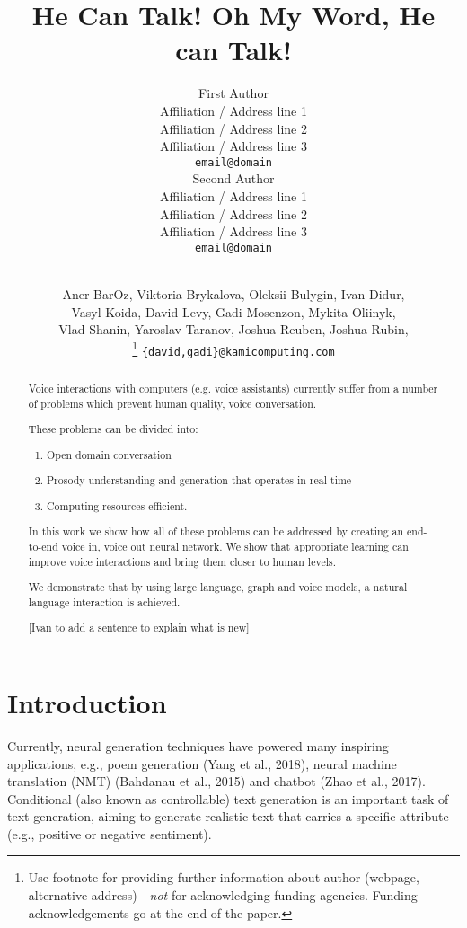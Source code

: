 \documentclass[11pt,a4paper]{article}
\title{He Can Talk! Oh My Word, He can Talk!}
\author{First Author \\
  Affiliation / Address line 1 \\
  Affiliation / Address line 2 \\
  Affiliation / Address line 3 \\
  \texttt{email@domain} \\\And
  Second Author \\
  Affiliation / Address line 1 \\
  Affiliation / Address line 2 \\
  Affiliation / Address line 3 \\
  \texttt{email@domain} \\}
\date{}
\begin{document}
\maketitle

\author{\\
  Aner BarOz, Viktoria Brykalova, Oleksii Bulygin, Ivan Didur,\\
Vasyl Koida, David Levy, Gadi Mosenzon, Mykita Oliinyk,\\ 
Vlad Shanin, Yaroslav Taranov, Joshua Reuben, Joshua Rubin,\\
\thanks{ Use footnote for providing further information about author (webpage, alternative address)---\emph{not} for acknowledging funding agencies.  Funding acknowledgements go at the end of the paper.}    
\texttt{\{david,gadi\}@kamicomputing.com} \\
}

\newcommand{\fix}{\marginpar{FIX}}
\newcommand{\new}{\marginpar{NEW}}

\begin{abstract}
Voice interactions with computers (e.g. voice assistants) currently suffer from a number of problems which prevent human quality, voice conversation.

These problems can be divided into:
\begin{enumerate} %
  \item Open domain conversation  
  \item Prosody understanding and generation that operates in real-time
  \item Computing resources efficient. 
\end{enumerate}

In this work we show how all of these problems can be addressed by creating an end-to-end voice in, voice out neural network. We show that appropriate learning can improve voice interactions and bring them closer to human levels. 

We demonstrate that by using large language, graph and voice models, a natural language interaction is achieved. 

[Ivan to add a sentence to explain what is new]
\end{abstract}

\section{Introduction}
Currently, neural generation techniques have powered many inspiring applications, e.g., poem generation (Yang et al., 2018), neural machine translation
(NMT) (Bahdanau et al., 2015) and chatbot (Zhao
et al., 2017). Conditional (also known as controllable) text generation is an important task of text
generation, aiming to generate realistic text that
carries a specific attribute (e.g., positive or negative
sentiment). 
\end{document}
